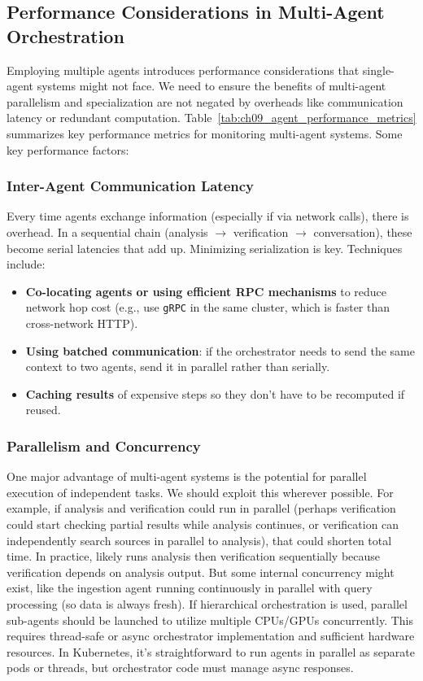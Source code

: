 \subsection*{Performance Considerations in Multi-Agent Orchestration}
Employing multiple agents introduces performance considerations that single-agent systems might not face. We need to ensure the benefits of multi-agent parallelism and specialization are not negated by overheads like communication latency or redundant computation. Table~\ref{tab:ch09_agent_performance_metrics} summarizes key performance metrics for monitoring multi-agent systems. Some key performance factors:

\subsubsection*{Inter-Agent Communication Latency}
Every time agents exchange information (especially if via network calls), there is overhead. In a sequential chain (analysis $\rightarrow$ verification $\rightarrow$ conversation), these become serial latencies that add up. Minimizing serialization is key. Techniques include:
\begin{itemize}
    \item \textbf{Co-locating agents or using efficient RPC mechanisms} to reduce network hop cost (e.g., use \texttt{gRPC} in the same cluster, which is faster than cross-network HTTP).
    \item \textbf{Using batched communication}: if the orchestrator needs to send the same context to two agents, send it in parallel rather than serially.
    \item \textbf{Caching results} of expensive steps so they don’t have to be recomputed if reused.
\end{itemize}

\subsubsection*{Parallelism and Concurrency}
One major advantage of multi-agent systems is the potential for parallel execution of independent tasks. We should exploit this wherever possible. For example, if analysis and verification could run in parallel (perhaps verification could start checking partial results while analysis continues, or verification can independently search sources in parallel to analysis), that could shorten total time. In practice, \ishtar{} likely runs analysis then verification sequentially because verification depends on analysis output. But some internal concurrency might exist, like the ingestion agent running continuously in parallel with query processing (so data is always fresh). If hierarchical orchestration is used, parallel sub-agents should be launched to utilize multiple CPUs/GPUs concurrently. This requires thread-safe or async orchestrator implementation and sufficient hardware resources. In Kubernetes, it’s straightforward to run agents in parallel as separate pods or threads, but orchestrator code must manage async responses.

